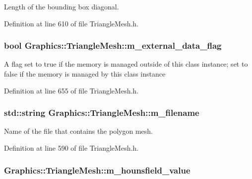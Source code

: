 Length of the bounding box diagonal. 



Definition at line 610 of file TriangleMesh.h.

\hypertarget{class_graphics_1_1_triangle_mesh_a5cd39cd89a74ead177b28f465ca2731c}{
\subsubsection[{m\_\-external\_\-data\_\-flag}]{\setlength{\rightskip}{0pt plus 5cm}bool {\bf Graphics::TriangleMesh::m\_\-external\_\-data\_\-flag}}}
\label{class_graphics_1_1_triangle_mesh_a5cd39cd89a74ead177b28f465ca2731c}
A flag set to true if the memory is managed outside of this class instance; set to false if the memory is managed by this class instance 

Definition at line 655 of file TriangleMesh.h.

\hypertarget{class_graphics_1_1_triangle_mesh_a56b0d42513921080062ff7c9f3099b28}{
\subsubsection[{m\_\-filename}]{\setlength{\rightskip}{0pt plus 5cm}std::string {\bf Graphics::TriangleMesh::m\_\-filename}}}
\label{class_graphics_1_1_triangle_mesh_a56b0d42513921080062ff7c9f3099b28}


Name of the file that contains the polygon mesh. 



Definition at line 590 of file TriangleMesh.h.

\hypertarget{class_graphics_1_1_triangle_mesh_a08404cbf123b9ed99bd10ddb1b4626a4}{
\subsubsection[{m\_\-hounsfield\_\-value}]{ {\bf Graphics::TriangleMesh::m\_\-hounsfield\_\-value}}}
\label{class_graphics_1_1_triangle_mesh_a08404cbf123b9ed99bd10ddb1b4626a4}


